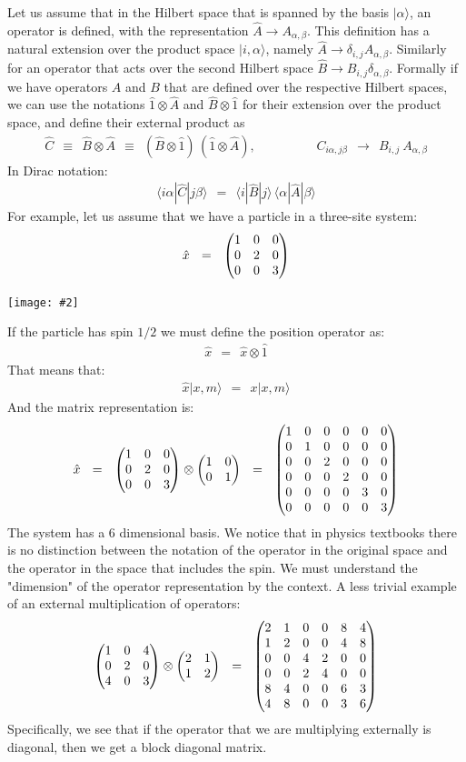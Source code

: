 \documentclass[onecolumn,fleqn]{revtex4}
\newcommand{\amatrix}[1]{\begin{matrix} #1 \end{matrix}}
\newcommand{\putgraph}[2][0.30\hsize]{\texttt{[image: \#2]}}
\newcommand{\beq}{\begin{eqnarray}}
\newcommand{\eeq}{\end{eqnarray}}
\begin{document}
Let us assume that in the Hilbert space 
that is spanned by the basis ${|\alpha\rangle}$, 
an operator is defined, with the representation ${\hat{A} \rightarrow A_{\alpha,\beta}}$. 
This definition has a natural extension over the 
product space ${|i,\alpha\rangle}$, 
namely ${\hat{A} \rightarrow \delta_{i,j} A_{\alpha,\beta}}$.
Similarly for an operator that acts over 
the second Hilbert space ${\hat{B} \rightarrow B_{i,j} \delta_{\alpha,\beta}}$.
Formally if we have operators $A$ and $B$ that are defined 
over the respective Hilbert spaces, 
we can use the notations $\hat{1} \otimes \hat{A}$ 
and  $\hat{B} \otimes \hat{1}$ for their extension over the 
product space, and define their external product as 
\beq
\hat{C} \ \ \equiv \ \ \hat{B} \otimes \hat{A} 
\ \ \equiv \ \ (\hat{B} \otimes \hat{1}) \, (\hat{1} \otimes \hat{A}),
\hspace{2cm}
C_{i\alpha,j\beta} \ \ \rightarrow \ \ B_{i,j} \ A_{\alpha,\beta} 
\eeq
In Dirac notation:
\beq
\langle i\alpha | \hat{C} | j \beta\rangle \ \ = \ \ \langle i | \hat{B} |j \rangle \, \langle \alpha | \hat{A} | \beta \rangle 
\eeq
For example, let us assume that we have 
a particle in a three-site system:
\beq
\hat{x} \ \ = \ \ \left(\amatrix{1&0&0\cr 0&2&0\cr 0&0&3}\right) 
\eeq


\begin{center}
\putgraph{OpenThreeSiteSystem}
\end{center}


If the particle has spin $1/2$ we must define the position operator as:
\beq
\hat{x} \ \ = \ \ \hat{x}\otimes \hat{ 1} 
\eeq
That means that:
\beq
\hat{x} |x,m \rangle \ \ = \ \  x | x, m \rangle 
\eeq
And the matrix representation is:
\beq
\hat{x} \ \ = \ \ \left(\amatrix{1&0&0\cr 0&2&0\cr 0&0&3}\right) \otimes \left( \amatrix{1&0\cr 0&1} \right) 
\ \ = \ \ \left(\amatrix{1&0&0&0&0&0\cr 0&1&0&0&0&0\cr 0&0&2&0&0&0\cr 0&0&0&2&0&0\cr 0&0&0&0&3&0 \cr 0&0&0&0&0&3 }\right) 
\eeq
The system has a 6 dimensional basis. We notice 
that in physics textbooks there is no distinction 
between the notation of the operator in the original 
space and the operator in the space that includes 
the spin. We must understand the "dimension" of the 
operator representation by the context. A less trivial 
example of an external multiplication of operators:
\beq
\left(\amatrix{1&0&4\cr 0&2&0\cr 4&0&3}\right) \otimes \left(\amatrix{2&1\cr 1&2}\right) 
\ \ = \ \ \left(\amatrix{2&1&0&0&8&4\cr 1&2&0&0&4&8\cr 0&0&4&2&0&0\cr 0&0&2&4&0&0\cr 8&4&0&0&6&3 \cr 4&8&0&0&3&6} \right) 
\eeq
Specifically, we see that if the operator 
that we are multiplying externally is diagonal, 
then we get a block diagonal matrix. 
\end{document}
